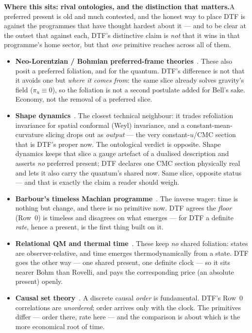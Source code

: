 \documentclass[11pt]{article}
\begin{document}
\textbf{Where this sits: rival ontologies, and the distinction that matters.}\enspace A preferred present
is old and much contested, and the honest way to place DTF is against the programmes that have thought
hardest about it --- and to be clear at the outset that against each, DTF's distinctive claim is \emph{not}
that it wins in that programme's home sector, but that \emph{one} primitive reaches across all of them.
\begin{itemize}[leftmargin=1.5em,itemsep=3pt,topsep=3pt]
  \item \textbf{Neo-Lorentzian / Bohmian preferred-frame theories}~\cite{Maudlin2011,DGNSZ2014}. These also
    posit a preferred foliation, and for the quantum. DTF's difference is not that it avoids one but
    \emph{where it comes from}: the same slice already solves gravity's field ($\pi_u\equiv0$), so the
    foliation is not a second postulate added for Bell's sake. Economy, not the removal of a preferred slice.
  \item \textbf{Shape dynamics}~\cite{GomesGrybKoslowski2011}. The closest technical neighbour: it trades
    refoliation invariance for spatial conformal (Weyl) invariance, and a constant-mean-curvature slicing
    drops out as \emph{output} --- the very constant-$u$/CMC section that is DTF's proper now. The
    ontological verdict is opposite. Shape dynamics keeps that slice a gauge artefact of a dualised
    description and asserts \emph{no} preferred present; DTF declares one CMC section physically real and
    lets it also carry the quantum's shared now. Same slice, opposite status --- and that is exactly the
    claim a reader should weigh.
  \item \textbf{Barbour's timeless Machian programme}~\cite{Barbour1999}. The inverse wager: time is
    nothing but change, and there is no primitive now. DTF agrees the \emph{floor} (Row~0) is timeless and
    disagrees on what emerges --- for DTF a definite \emph{rate}, hence a present, is the first thing built
    on it.
  \item \textbf{Relational QM and thermal time}~\cite{Rovelli1996,ConnesRovelli1994}. These keep \emph{no}
    shared foliation: states are observer-relative, and time emerges thermodynamically from a state. DTF
    goes the other way --- one shared present, one definite clock --- so it sits nearer Bohm than Rovelli,
    and pays the corresponding price (an absolute present) openly.
  \item \textbf{Causal set theory}~\cite{Bombelli1987}. A discrete causal \emph{order} is fundamental. DTF's
    Row~0 correlations are \emph{unordered}; order arrives only with the clock. The primitives differ ---
    order there, rate here --- and the comparison is about which is the more economical root of time.
\end{itemize}
\end{document}
